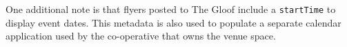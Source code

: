 



One additional note is that flyers posted to The Gloof include a \texttt{startTime}
to display event dates.
This metadata is also used to populate a separate calendar application
used by the co-operative that owns the venue space.




